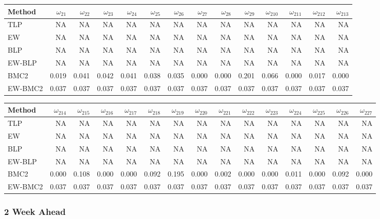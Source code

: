\documentclass[
]{article}
\begin{document}
\begin{tabular}{lrrrrrrrrrrrrr}
\toprule
Method & $\omega_{21}$ & $\omega_{22}$ & $\omega_{23}$ & $\omega_{24}$ & $\omega_{25}$ & $\omega_{26}$ & $\omega_{27}$ & $\omega_{28}$ & $\omega_{29}$ & $\omega_{210}$ & $\omega_{211}$ & $\omega_{212}$ & $\omega_{213}$\\
\midrule
TLP & NA & NA & NA & NA & NA & NA & NA & NA & NA & NA & NA & NA & NA\\
EW & NA & NA & NA & NA & NA & NA & NA & NA & NA & NA & NA & NA & NA\\
BLP & NA & NA & NA & NA & NA & NA & NA & NA & NA & NA & NA & NA & NA\\
EW-BLP & NA & NA & NA & NA & NA & NA & NA & NA & NA & NA & NA & NA & NA\\
BMC2 & 0.019 & 0.041 & 0.042 & 0.041 & 0.038 & 0.035 & 0.000 & 0.000 & 0.201 & 0.066 & 0.000 & 0.017 & 0.000\\
EW-BMC2 & 0.037 & 0.037 & 0.037 & 0.037 & 0.037 & 0.037 & 0.037 & 0.037 & 0.037 & 0.037 & 0.037 & 0.037 & 0.037\\
\bottomrule
\end{tabular}

\begin{tabular}{lrrrrrrrrrrrrrr}
\toprule
Method & $\omega_{214}$ & $\omega_{215}$ & $\omega_{216}$ & $\omega_{217}$ & $\omega_{218}$ & $\omega_{219}$ & $\omega_{220}$ & $\omega_{221}$ & $\omega_{222}$ & $\omega_{223}$ & $\omega_{224}$ & $\omega_{225}$ & $\omega_{226}$ & $\omega_{227}$\\
\midrule
TLP & NA & NA & NA & NA & NA & NA & NA & NA & NA & NA & NA & NA & NA & NA\\
EW & NA & NA & NA & NA & NA & NA & NA & NA & NA & NA & NA & NA & NA & NA\\
BLP & NA & NA & NA & NA & NA & NA & NA & NA & NA & NA & NA & NA & NA & NA\\
EW-BLP & NA & NA & NA & NA & NA & NA & NA & NA & NA & NA & NA & NA & NA & NA\\
BMC2 & 0.000 & 0.108 & 0.000 & 0.000 & 0.092 & 0.195 & 0.000 & 0.002 & 0.000 & 0.000 & 0.011 & 0.000 & 0.092 & 0.000\\
EW-BMC2 & 0.037 & 0.037 & 0.037 & 0.037 & 0.037 & 0.037 & 0.037 & 0.037 & 0.037 & 0.037 & 0.037 & 0.037 & 0.037 & 0.037\\
\bottomrule
\end{tabular}

\hypertarget{week-ahead-17}{%
\subsubsection{2 Week Ahead}\label{week-ahead-17}}
\end{document}
